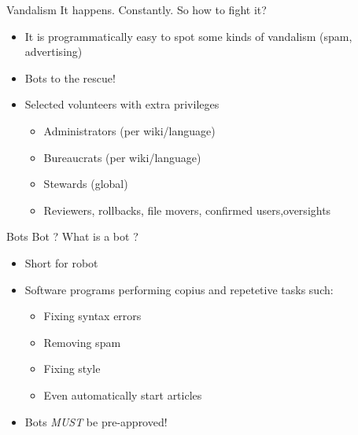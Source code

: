 \documentclass{beamer}
\begin{document}
\begin{frame}{Vandalism}
	It happens. Constantly. So how to fight it?
	\begin{itemize}
		\pause \item It is programmatically easy to spot some kinds of vandalism (spam, advertising)
		\pause \item Bots to the rescue!
		\pause \item Selected volunteers with extra privileges
			\begin{itemize}
				\pause \item Administrators (per wiki/language)
				\pause \item Bureaucrats (per wiki/language)
				\pause \item Stewards (global)
				\pause \item Reviewers, rollbacks, file movers, confirmed users,oversights
			\end{itemize}
	\end{itemize}
\end{frame}
\begin{frame} {Bots}
	Bot ? What is a bot ?
	\begin{itemize}
		\pause \item Short for robot
		\pause \item Software programs performing copius and repetetive tasks such:
			\begin{itemize}
				\pause \item Fixing syntax errors
				\pause \item Removing spam
				\pause \item Fixing style
				\pause \item Even automatically start articles
			\end{itemize}
		\pause \item Bots \emph{MUST} be pre-approved!
	\end{itemize}
\end{frame}
\end{document}
